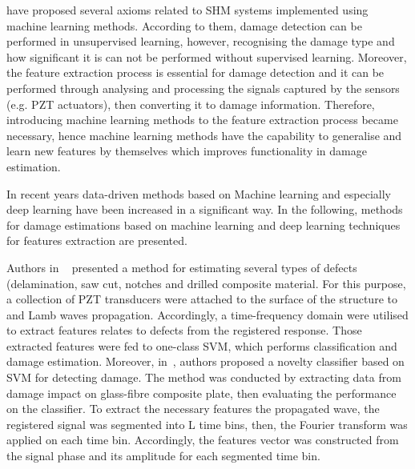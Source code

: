  have proposed several axioms related to SHM systems implemented using machine learning methods. 
According to them, damage detection can be performed in unsupervised learning, however, recognising the damage type and how significant it is can not be performed without supervised learning. 
Moreover, the feature extraction process is essential for damage detection and it can be performed through analysing and processing the signals captured by the sensors (e.g. PZT actuators), then converting it to damage information.
Therefore, introducing machine learning methods to the feature extraction process became necessary, hence machine learning methods have the capability to generalise and learn new features by themselves which improves   functionality in damage estimation.

In recent years data-driven methods based on Machine learning and especially deep learning have been increased in a significant way. 
In the following, methods for damage estimations based on machine learning and deep learning techniques for features extraction are presented. 

Authors in ~\cite{Das2010} presented a method for estimating several types of defects (delamination, saw cut, notches and drilled   composite material. For this purpose, a collection of PZT transducers were attached to the surface of the structure to   and   Lamb waves propagation. 
Accordingly, a time-frequency domain were utilised to extract features relates to  defects from the registered response. Those extracted features were fed to one-class SVM, which performs classification and damage estimation. 
Moreover, in~\cite{Dib2018}, authors proposed a novelty classifier based on   SVM for detecting damage. The method was conducted by extracting data from damage impact on glass-fibre composite plate, then evaluating the performance on the classifier. To extract the necessary features   the propagated wave, the registered signal was segmented into L time bins, then, the Fourier transform was applied on each time bin.
Accordingly, the features vector was constructed from the signal phase and its amplitude for each segmented time bin.


